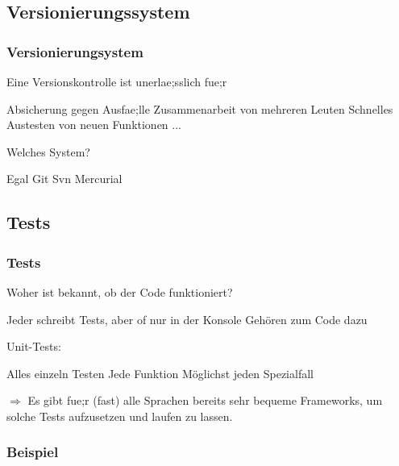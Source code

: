 \documentclass{beamer}
\begin{document}
\subsection{Versionierungssystem}
\begin{frame}
    \frametitle{Versionierungsystem}

    Eine Versionskontrolle ist unerlae;sslich fue;r
    \begin{outline}
        \1 Absicherung gegen Ausfae;lle
        \1 Zusammenarbeit von mehreren Leuten
        \1 Schnelles Austesten von neuen Funktionen
        \1 ...
    \end{outline} \pause

    Welches System?
    \begin{outline}
        \1 Egal
        \2 Git
        \2 Svn
        \2 Mercurial
    \end{outline}
\end{frame}
\subsection{Tests}
\begin{frame}
    \frametitle{Tests}
    Woher ist bekannt, ob der Code funktioniert?\pause

    \begin{outline}
        \1 Jeder schreibt Tests, aber of nur in der Konsole
        \1 Gehören zum Code dazu
    \end{outline} \pause

    Unit-Tests:
    \begin{outline}
        \1 Alles einzeln Testen
            \2 Jede Funktion
            \2 Möglichst jeden Spezialfall
    \end{outline}
    $\Rightarrow$ Es gibt fue;r (fast) alle Sprachen bereits sehr bequeme
    Frameworks, um solche Tests aufzusetzen und laufen zu lassen.
\end{frame}
\begin{frame}
    \frametitle{Beispiel}
\end{frame}
\end{document}
